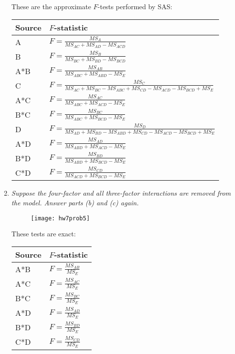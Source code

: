 \documentclass[11pt]{article}
\begin{document}
\begin{enumerate}
\begin{enumerate}
These are the approximate \(F\)-tests performed by SAS:

\begin{table}[H]\centering\renewcommand{\arraystretch}{1.5}
\begin{tabular}{|l|l|}
\hline
Source & \(F\)-statistic \\
\hline
A & \(F=\frac{MS_{A}}{MS_{AC}+MS_{AD}-MS_{ACD}}\) \\
\hline
B & \(F=\frac{MS_{B}}{MS_{BC}+MS_{BD}-MS_{BCD}}\) \\
\hline
A*B & \(F=\frac{MS_{AB}}{MS_{ABC}+MS_{ABD}-MS_{E}}\) \\
\hline
C & \(F=\frac{MS_{C}}
{MS_{AC}+MS_{BC}-MS_{ABC}+MS_{CD}-MS_{ACD}-MS_{BCD}+MS_{E}}\) \\
\hline
A*C & \(F=\frac{MS_{AC}}{MS_{ABC}+MS_{ACD}-MS_{E}}\) \\
\hline
B*C & \(F=\frac{MS_{BC}}{MS_{ABC}+MS_{BCD}-MS_{E}}\) \\
\hline
D & \(F=\frac{MS_{D}}
{MS_{AD}+MS_{BD}-MS_{ABD}+MS_{CD}-MS_{ACD}-MS_{BCD}+MS_{E}}\) \\
\hline
A*D & \(F=\frac{MS_{AD}}{MS_{ABD}+MS_{ACD}-MS_{E}}\) \\
\hline
B*D & \(F=\frac{MS_{BD}}{MS_{ABD}+MS_{BCD}-MS_{E}}\) \\
\hline
C*D & \(F=\frac{MS_{CD}}{MS_{ACD}+MS_{BCD}-MS_{E}}\) \\
\hline
\end{tabular}
\end{table}

\pagebreak
\item %
{\it Suppose the four-factor and all three-factor interactions are removed
from the model. Answer parts (b) and (c) again.}

\begin{figure}[H]
\texttt{[image: hw7prob5]}
\end{figure}

These tests are exact:

\begin{table}[H]\centering\renewcommand{\arraystretch}{1.5}
\begin{tabular}{|l|l|}
\hline
Source & \(F\)-statistic \\
\hline
A*B & \(F=\frac{MS_{AB}}{MS_{E}}\) \\
\hline
A*C & \(F=\frac{MS_{AC}}{MS_{E}}\) \\
\hline
B*C & \(F=\frac{MS_{BC}}{MS_{E}}\) \\
\hline
A*D & \(F=\frac{MS_{AD}}{MS_{E}}\) \\
\hline
B*D & \(F=\frac{MS_{BD}}{MS_{E}}\) \\
\hline
C*D & \(F=\frac{MS_{CD}}{MS_{E}}\) \\
\hline
\end{tabular}
\end{table}


\end{enumerate}
\end{enumerate}
\end{document}
